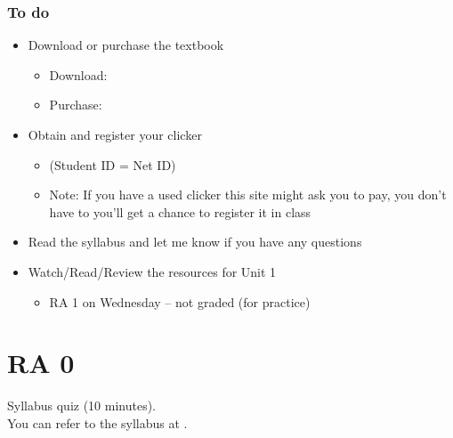 \documentclass[slidestop,compress,mathserif,12pt,t,professionalfonts,xcolor=table]{beamer}
\begin{document}
\begin{frame}
\frametitle{To do}

\begin{itemize}

\item Download or purchase the textbook
\begin{itemize}
\item Download: 
\item Purchase: 
\end{itemize}

\item Obtain and register your clicker
\begin{itemize}
\item {} (Student ID = Net ID) 
\item Note: If you have a used clicker this site might ask you to pay, you don't have to
you'll get a chance to register it in class
\end{itemize}

\item Read the syllabus and let me know if you have any questions

\item Watch/Read/Review the resources for Unit 1
\begin{itemize}
\item RA 1 on Wednesday -- not graded (for practice)
\end{itemize}

\end{itemize}

\end{frame}


\section{RA 0}


\begin{frame}

\vfill

Syllabus quiz (10 minutes). \\

You can refer to the syllabus at \webURL{\CourseSite}.

\vfill

\end{frame}
\end{document}
